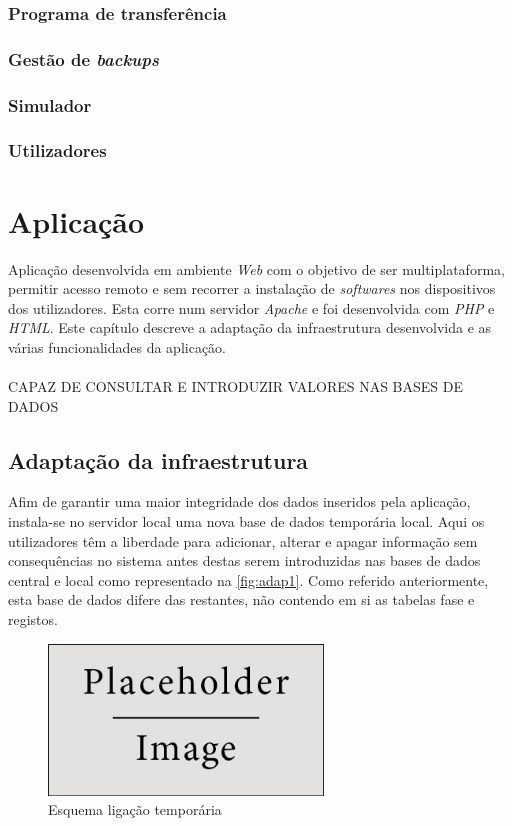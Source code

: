 \documentclass[11pt,twoside,a4paper]{report}
\begin{document}
\subsection{Programa de transferência}

\subsection{Gestão de \textit{backups}}

\subsection{Simulador}

\subsection{Utilizadores}

\cleardoublepage
\chapter{Aplicação}
Aplicação desenvolvida em ambiente  \textit{Web} com o objetivo de ser multiplataforma, permitir acesso remoto e sem recorrer a instalação de \textit{softwares} nos dispositivos dos utilizadores. Esta corre num servidor \textit{Apache} e foi desenvolvida com \textit{PHP} e \textit{HTML}. Este capítulo descreve a adaptação da infraestrutura desenvolvida e as várias funcionalidades da aplicação.\\
\\
CAPAZ DE CONSULTAR E INTRODUZIR VALORES NAS BASES DE DADOS

\section{Adaptação da infraestrutura}
Afim de garantir uma maior integridade dos dados inseridos pela aplicação, instala-se no servidor local uma nova base de dados temporária local. Aqui os utilizadores têm a liberdade para adicionar, alterar e apagar informação sem consequências no sistema antes destas serem introduzidas nas bases de dados central e local como representado na \autoref{fig:adap1}. Como referido anteriormente, esta base de dados difere das restantes, não contendo em si as tabelas fase e registos.
\begin{figure}[H]
	\begin{center}
		\includegraphics[width=0.65\textwidth]{placeholder} %
		\caption{Esquema ligação temporária}
		\label{fig:adap1}
	\end{center}
\end{figure}
\end{document}
